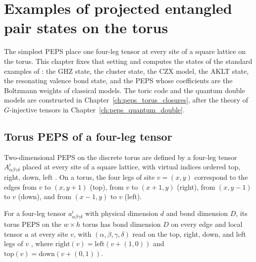 
\chapter{Examples of projected entangled pair states on the torus}%
\label{ch:peps_examples}

The simplest PEPS place one four-leg tensor at every site of a square lattice
on the torus. This chapter fixes that setting and computes the states of the
standard examples of \cite[Appendix~A]{Cirac2021Matrix}: the GHZ state, the
cluster state, the CZX model, the AKLT state, the resonating valence bond
state, and the PEPS whose coefficients are the Boltzmann weights of classical
models. The toric code and the quantum double models are constructed in
Chapter~\ref{ch:peps_torus_closures}, after the theory of $G$-injective
tensors in Chapter~\ref{ch:peps_quantum_double}.

\section{Torus PEPS of a four-leg tensor}%
\label{sec:peps_torus_site_tensor}

Two-dimensional PEPS on the discrete torus are defined by a four-leg tensor
$A^i_{\alpha\beta\gamma\delta}$ placed at every site of a square lattice, with
virtual indices ordered top, right, down, left
\cite[Appendix~A, ``Two dimensions: PEPS'']{Cirac2021Matrix}. On a torus, the
four legs of site $v=(x,y)$ correspond to the edges from $v$ to $(x,y+1)$
(top), from $v$ to $(x+1,y)$ (right), from $(x,y-1)$ to $v$ (down), and from
$(x-1,y)$ to $v$ (left).

\begin{definition}%
    \label{def:peps_torus_site_tensor}
    \leanok
    For a four-leg tensor $a^i_{\alpha\beta\gamma\delta}$ with physical
    dimension $d$ and bond dimension $D$, its torus PEPS on the $w\times h$
    torus has bond dimension $D$ on every edge and local tensor $a$ at every
    site $v$, with $(\alpha,\beta,\gamma,\delta)$ read on the top, right, down,
    and left legs of $v$
    \cite[Appendix~A, ``Two dimensions: PEPS'']{Cirac2021Matrix}, where
    $\mathrm{right}(v)=\mathrm{left}(v+(1,0))$ and
    $\mathrm{top}(v)=\mathrm{down}(v+(0,1))$.
\end{definition}

